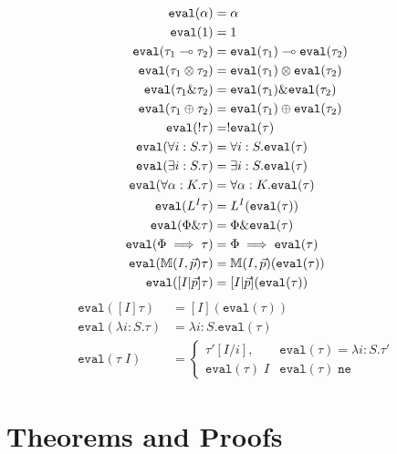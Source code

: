\begin{align*}
\texttt{eval}(\alpha) &= \alpha\\
\texttt{eval}(1) &= 1\\
\texttt{eval}(\tau_1 \multimap \tau_2) &= \texttt{eval}(\tau_1) \multimap \texttt{eval}(\tau_2)\\
\texttt{eval}(\tau_1 \otimes \tau_2) &= \texttt{eval}(\tau_1) \otimes \texttt{eval}(\tau_2)\\
\texttt{eval}(\tau_1 \& \tau_2) &= \texttt{eval}(\tau_1) \& \texttt{eval}(\tau_2)\\
\texttt{eval}(\tau_1 \oplus \tau_2) &= \texttt{eval}(\tau_1) \oplus \texttt{eval}(\tau_2)\\
\texttt{eval}(!\tau) &= !\texttt{eval}(\tau)\\
\texttt{eval}(\forall i : S. \tau) &= \forall i : S. \texttt{eval}(\tau)\\
\texttt{eval}(\exists i : S. \tau) &= \exists i : S. \texttt{eval}(\tau)\\
\texttt{eval}(\forall \alpha : K. \tau) &= \forall \alpha : K. \texttt{eval}(\tau)\\
\texttt{eval}(L^I\tau) &= L^I(\texttt{eval}(\tau))\\
\texttt{eval}(\Phi \& \tau) &= \Phi \& \texttt{eval}(\tau)\\
\texttt{eval}(\Phi \implies \tau) &= \Phi \implies \texttt{eval}(\tau)\\
\texttt{eval}(\mathbb{M}(I,\vec{p})\tau) &= \mathbb{M}(I,\vec{p})(\texttt{eval}(\tau))\\
\texttt{eval}([I|\vec{p}]\tau) &= [I|\vec{p}](\texttt{eval}(\tau))
\end{align*}
\begin{align*}
\texttt{eval}([I]\tau) &= [I](\texttt{eval}(\tau))\\
\texttt{eval}(\lambda i : S. \tau) &= \lambda i : S. \texttt{eval}(\tau)\\
\texttt{eval}(\tau \; I) &= \begin{cases}
   \tau'[I/i], & \texttt{eval}(\tau) = \lambda i : S. \tau' \\
   \texttt{eval}(\tau) \; I & \texttt{eval}(\tau) \; \texttt{ne}
                              \end{cases}
\end{align*}

\section{\dlambdaamor Theorems and Proofs}

